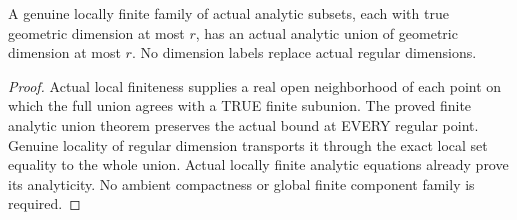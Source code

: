 \begin{lemma}
\label{hir:actual-locally-finite-analytic-union-full-dimension-bound}
\leanok
A genuine locally finite family of actual analytic subsets, each with true
geometric dimension at most $r$, has an actual analytic union of geometric
dimension at most $r$. No dimension labels replace actual regular dimensions.
\end{lemma}
\begin{proof}
Actual local finiteness supplies a real open neighborhood of each point on
which the full union agrees with a TRUE finite subunion. The proved finite
analytic union theorem preserves the actual bound at EVERY regular point.
Genuine locality of regular dimension transports it through the exact local
set equality to the whole union. Actual locally finite analytic equations
already prove its analyticity. No ambient compactness or global finite
component family is required.
\end{proof}

